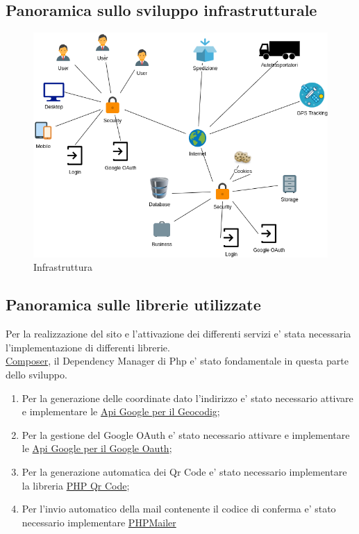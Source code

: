 \documentclass[a4paper, 12pt]{report}
\begin{document}
\subsection{Panoramica sullo sviluppo infrastrutturale}
\begin{figure}[H]
    \centering
    \includegraphics[scale=0.5]{img/pozzebonGrafic.png}
    \caption{Infrastruttura}
\end{figure}
\newpage

\subsection{Panoramica sulle librerie utilizzate} 

Per la realizzazione del sito e l’attivazione dei differenti servizi e’ stata necessaria l’implementazione di differenti librerie.\\
\href{https://getcomposer.org/}{Composer}, il Dependency Manager di Php e’ stato fondamentale in questa parte dello sviluppo.\\
\begin{enumerate}
    \label{label_api}
    \item Per la generazione delle coordinate dato l'indirizzo e' stato necessario attivare e implementare le \href{https://console.cloud.google.com/apis/library/geocoding-backend.googleapis.com}{Api Google per il Geocodig};
    \item Per la gestione del Google OAuth e’ stato necessario attivare e implementare le \href{https://developers.google.com/identity/protocols/oauth2}{Api Google per il Google Oauth};
    \item Per la generazione automatica dei Qr Code e’ stato necessario implementare la libreria \href{http://phpqrcode.sourceforge.net/}{PHP Qr Code};
    \item Per l’invio automatico della mail contenente il codice di conferma e’ stato necessario implementare \href{https://github.com/PHPMailer/PHPMailer}{PHPMailer}
\end{enumerate}
\end{document}
